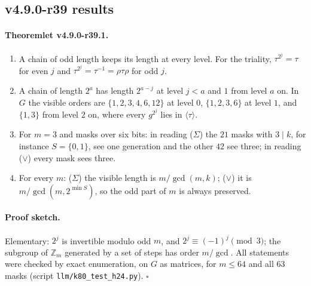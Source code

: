\subsection*{v4.9.0-r39 results}
\label{subsec:v490-r39-results}

\paragraph{Theoremlet v4.9.0-r39.1.}
\begin{enumerate}[leftmargin=2em]
\item[(a)] A chain of odd length keeps its length at every level.  For the triality, \(\tau^{2^j}=\tau\) for even \(j\) and
\(\tau^{2^j}=\tau^{-1}=\rho\tau\rho\) for odd \(j\).
\item[(b)] A chain of length \(2^a\) has length \(2^{a-j}\) at level \(j<a\) and \(1\) from level \(a\) on.  In \(G\) the visible orders are
\(\{1,2,3,4,6,12\}\) at level \(0\), \(\{1,2,3,6\}\) at level \(1\), and \(\{1,3\}\) from level \(2\) on, where every \(g^{2^j}\) lies in
\(\langle\tau\rangle\).
\item[(c)] For \(m=3\) and masks over six bits: in reading (\(\Sigma\)) the \(21\) masks with \(3\mid k\), for instance \(S=\{0,1\}\), see one
generation and the other \(42\) see three; in reading (\(\vee\)) every mask sees three.
\item[(d)] For every \(m\): (\(\Sigma\)) the visible length is \(m/\gcd(m,k)\); (\(\vee\)) it is \(m/\gcd(m,2^{\min S})\), so the odd part of \(m\)
is always preserved.
\end{enumerate}

\paragraph{Proof sketch.}
Elementary: \(2^j\) is invertible modulo odd \(m\), and \(2^j\equiv(-1)^j\pmod 3\); the subgroup of \(\mathbb Z_m\) generated by a set of
steps has order \(m/\gcd\).  All statements were checked by exact enumeration, on \(G\) as matrices, for \(m\le64\) and all \(63\) masks
(script \texttt{llm/k80\_test\_h24.py}).  \(\square\)

